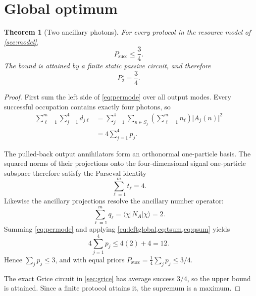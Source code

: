 \documentclass[11pt]{article}
\newtheorem{theorem}{Theorem}
\theoremstyle{remark}
\newcommand{\ket}[1]{\lvert #1\rangle}
\newcommand{\bra}[1]{\langle #1\rvert}
\newcommand{\abs}[1]{\lvert #1\rvert}
\newcommand{\psucc}{P_{\mathrm{succ}}}
\newcommand{\Pstar}{P_2^\star}
\begin{document}
\section{Global optimum}
\label{sec:global}

\begin{theorem}[Two ancillary photons]
\label{thm:main}
For every protocol in the resource model of \cref{sec:model},
\begin{equation}
  \psucc\le\frac34.
\end{equation}
The bound is attained by a finite static passive circuit, and therefore
\begin{equation}
  \boxed{\Pstar=\frac34.}
\end{equation}
\end{theorem}

\begin{proof}
First sum the left side of \cref{eq:permode} over all output modes. Every
successful occupation contains exactly four photons, so
\begin{align}
  \sum_{\ell=1}^m\sum_{j=1}^4d_{j\ell}
   &=\sum_{j=1}^4\sum_{n\in S_j}
     \left(\sum_{\ell=1}^mn_\ell\right)\abs{A_j(n)}^2 \\
   &=4\sum_{j=1}^4p_j.
  \label{eq:leftglobal}
\end{align}

The pulled-back output annihilators form an orthonormal one-particle basis.
The squared norms of their projections onto the four-dimensional signal
one-particle subspace therefore satisfy the Parseval identity
\begin{equation}
  \sum_{\ell=1}^mt_\ell=4.
  \label{eq:tsum}
\end{equation}
Likewise the ancillary projections resolve the ancillary number operator:
\begin{equation}
  \sum_{\ell=1}^mq_\ell
   =\bra\chi N_A\ket\chi=2.
  \label{eq:qsum}
\end{equation}
Summing \cref{eq:permode} and applying
\cref{eq:leftglobal,eq:tsum,eq:qsum} yields
\begin{equation}
  4\sum_{j=1}^4p_j\le4(2)+4=12.
\end{equation}
Hence \(\sum_jp_j\le3\), and with equal priors
\(\psucc=\frac14\sum_jp_j\le3/4\).

The exact Grice circuit in \cref{sec:grice} has average success \(3/4\), so the
upper bound is attained. Since a finite protocol attains it, the supremum is a
maximum.
\end{proof}
\end{document}
